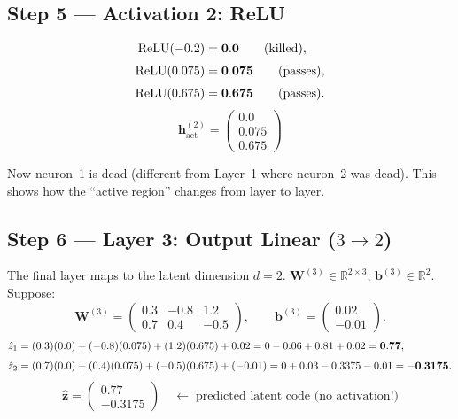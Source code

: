 \documentclass[11pt,a4paper]{article}
\newcommand{\R}{\mathbb{R}}
\newcommand{\bz}{\mathbf{z}}
\newcommand{\bW}{\mathbf{W}}
\newcommand{\bb}{\mathbf{b}}
\newcommand{\bh}{\mathbf{h}}
\begin{document}
\subsection{Step 5 --- Activation 2: ReLU}

\begin{align}
  \text{ReLU}(-0.2)  &= \mathbf{0.0}
    \qquad\text{(killed)}, \notag \\[3pt]
  \text{ReLU}(0.075) &= \mathbf{0.075}
    \qquad\text{(passes)}, \notag \\[3pt]
  \text{ReLU}(0.675) &= \mathbf{0.675}
    \qquad\text{(passes)}. \notag
\end{align}
\[
  \boxed{\bh^{(2)}_{\text{act}} = \begin{pmatrix} 0.0 \\ 0.075 \\ 0.675 \end{pmatrix}}
\]

Now neuron~1 is dead (different from Layer~1 where neuron~2 was dead).
This shows how the ``active region'' changes from layer to layer.

\subsection{Step 6 --- Layer 3: Output Linear ($3 \to 2$)}

The final layer maps to the latent dimension $d=2$.
$\bW^{(3)} \in \R^{2 \times 3}$, $\bb^{(3)} \in \R^2$.  Suppose:
\[
  \bW^{(3)} =
  \begin{pmatrix}
    0.3 & -0.8 &  1.2 \\
    0.7 &  0.4 & -0.5
  \end{pmatrix},
  \qquad
  \bb^{(3)} =
  \begin{pmatrix} 0.02 \\ -0.01 \end{pmatrix}.
\]
\begin{align}
  \hat{z}_1 &= (0.3)(0.0) + (-0.8)(0.075) + (1.2)(0.675) + 0.02
             = 0 - 0.06 + 0.81 + 0.02
             = \mathbf{0.77}, \notag \\[4pt]
  \hat{z}_2 &= (0.7)(0.0) + (0.4)(0.075) + (-0.5)(0.675) + (-0.01)
             = 0 + 0.03 - 0.3375 - 0.01
             = \mathbf{-0.3175}. \notag
\end{align}
\[
  \boxed{\hat{\bz} = \begin{pmatrix} 0.77 \\ -0.3175 \end{pmatrix}}
  \quad\longleftarrow\;\text{predicted latent code (no activation!)}
\]
\end{document}
